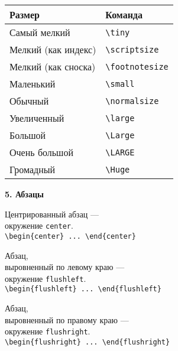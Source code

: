 \documentclass{article}
\begin{document}
\bigskip

\begin{center}
\noindent\begin{tabular}{|l|l|}
\hline
\bfseries     Размер              &\bfseries Команда    \\ \hline
\tiny         Самый мелкий        &\verb"\tiny"         \\ \hline
\scriptsize   Мелкий (как индекс) &\verb"\scriptsize"   \\ \hline
\footnotesize Мелкий (как сноска) &\verb"\footnotesize" \\ \hline
\small        Маленький           &\verb"\small"        \\ \hline
              Обычный             &\verb"\normalsize"   \\ \hline
\large        Увеличенный         &\verb"\large"        \\ \hline
\Large        Большой             &\verb"\Large"        \\ \hline
\LARGE        Очень большой       &\verb"\LARGE"        \\ \hline
\Huge         Громадный           &\verb"\Huge"         \\ \hline
\end{tabular}
\end{center}

\newpage

\textbf{5. Абзацы}

\bigskip

\begin{center}
Центрированный абзац ---\\ окружение \texttt{center}.\\[2mm]
\verb"\begin{center} ... \end{center}"
\end{center}

\begin{flushleft}
Абзац, \\выровненный по левому краю ---\\ окружение \texttt{flushleft}.\\[2mm]
\verb"\begin{flushleft} ... \end{flushleft}"
\end{flushleft}

\begin{flushright}
Абзац, \\выровненный по правому краю ---\\ окружение \texttt{flushright}.\\[2mm]
\verb"\begin{flushright} ... \end{flushright}"
\end{flushright}
\end{document}
